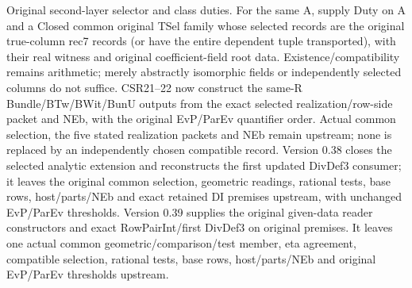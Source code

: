 \begin{description}[style=nextline]
\item[30. SECOND\_LAYER\_COMPATIBLE\_SELECTION --- C] Original second-layer selector and class duties. For the same A, supply Duty on A and a Closed common original TSel family whose selected records are the original true-column rec7 records (or have the entire dependent tuple transported), with their real witness and original coefficient-field root data. Existence/\allowbreak{}compatibility remains arithmetic; merely abstractly isomorphic fields or independently selected columns do not suffice. CSR21–22 now construct the same-R Bundle/\allowbreak{}BTw/\allowbreak{}BWit/\allowbreak{}BunU outputs from the exact selected realization/\allowbreak{}row-side packet and NEb, with the original EvP/\allowbreak{}ParEv quantifier order. Actual common selection, the five stated realization packets and NEb remain upstream; none is replaced by an independently chosen compatible record. Version 0.38 closes the selected analytic extension and reconstructs the first updated DivDef3 consumer; it leaves the original common selection, geometric readings, rational tests, base rows, host/\allowbreak{}parts/\allowbreak{}NEb and exact retained DI premises upstream, with unchanged EvP/\allowbreak{}ParEv thresholds. Version 0.39 supplies the original given-data reader constructors and exact RowPairInt/\allowbreak{}first DivDef3 on original premises. It leaves one actual common geometric/\allowbreak{}comparison/\allowbreak{}test member, eta agreement, compatible selection, rational tests, base rows, host/\allowbreak{}parts/\allowbreak{}NEb and original EvP/\allowbreak{}ParEv thresholds upstream.


\end{description}
